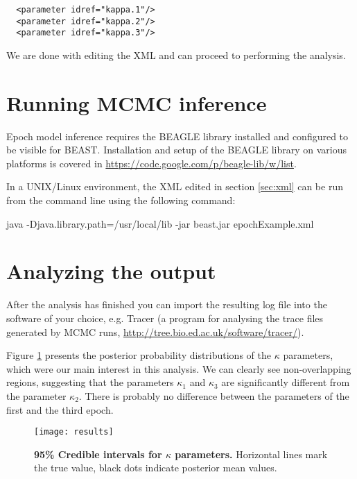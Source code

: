 \begin{lstlisting}
  <parameter idref="kappa.1"/>
  <parameter idref="kappa.2"/>
  <parameter idref="kappa.3"/>
\end{lstlisting}

We are done with editing the XML and can proceed to performing the analysis.

\section{Running MCMC inference}

Epoch model inference requires the BEAGLE library installed and configured to be visible for BEAST.
Installation and setup of the BEAGLE library on various platforms is covered in \url{https://code.google.com/p/beagle-lib/w/list}.

In a UNIX/Linux environment, the XML edited in section \ref{sec:xml} can be run from the command line using the following command:

\begin{code}
java -Djava.library.path=/usr/local/lib -jar beast.jar epochExample.xml
\end{code}


\section{Analyzing the output}

After the analysis has finished you can import the resulting log file into the software of your choice, e.g. Tracer (a program for analysing the trace files generated by MCMC runs, \url{http://tree.bio.ed.ac.uk/software/tracer/}).

Figure \ref{fig:results} presents the posterior probability distributions of the $\kappa$ parameters, which were our main interest in this analysis. 
We can clearly see non-overlapping regions, suggesting that the parameters $\kappa_1$ and $\kappa_3$ are significantly different from the parameter $\kappa_2$.
There is probably no difference between the parameters of the first and the third epoch.

\begin{figure}[H]
\centering
\texttt{[image: results]} 
\caption{
{ \footnotesize 
{\bf 95\% Credible intervals for $\kappa$ parameters.} Horizontal lines mark the true value, black dots indicate posterior mean values.
} %
}
\label{fig:results}
\end{figure}












% 
